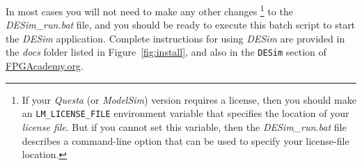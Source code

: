 \documentclass[11pt, twoside, pdftex]{article}
\newcommand{\commonPath}{../../../Tutorials/Common}
\begin{document}
In most cases you will not need to make any other changes
\footnote{If your {\it Questa} (or {\it ModelSim}) version requires a license, then you should
make an \texttt{LM\_LICENSE\_FILE} environment variable that specifies the location of your
{\it license file}. But if you cannot set this variable, then the {\it DESim\_run.bat} file 
describes a command-line option that can be used to specify your license-file location.}
to the {\it DESim\_run.bat} file, and you 
should be ready to execute this batch script to start the {\it DESim} application. Complete
instructions for using {\it DESim} are provided in the {\it docs} folder listed in 
Figure~\ref{fig:install}, and also in the 
\texttt{DESim} section of {\small \href{https://www.fpgacademy.org/tools.html}
{FPGAcademy.org}}.



\end{document}
